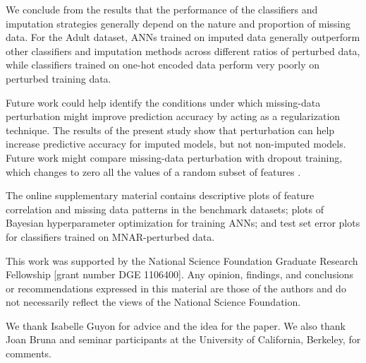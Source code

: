 \documentclass[10pt]{book}
\theoremstyle{definition}
\begin{document}
We conclude from the results that the performance of the classifiers and imputation strategies generally depend on the nature and proportion of missing data. For the Adult dataset, ANNs trained on imputed data generally outperform other classifiers and imputation methods across different ratios of perturbed data, while classifiers trained on one-hot encoded data perform very poorly on perturbed training data. 

Future work could help identify the conditions under which missing-data perturbation might improve prediction accuracy by acting as a regularization technique. The results of the present study show that perturbation can help increase predictive accuracy for imputed models, but not non-imputed models. Future work might compare missing-data perturbation with dropout training, which changes to zero all the values of a random subset of features \citep{hinton2012, maaten2013, wang2013}. 

\par
\vskip 14pt

The online supplementary material contains descriptive plots of feature correlation and missing data patterns in the benchmark datasets; plots of Bayesian hyperparameter optimization for training ANNs; and test set error plots for classifiers trained on MNAR-perturbed data. %

\par
\vskip 14pt

This work was supported by the National Science Foundation Graduate Research Fellowship [grant number DGE 1106400]. Any opinion, findings, and conclusions or recommendations expressed in this material are those of the authors and do not necessarily reflect the views of the National Science Foundation.
\par
\vskip 14pt

We thank Isabelle Guyon for advice and the idea for the paper. We also thank Joan Bruna and seminar participants at the University of California, Berkeley, for comments. %
\par
\clearpage
\end{document}
